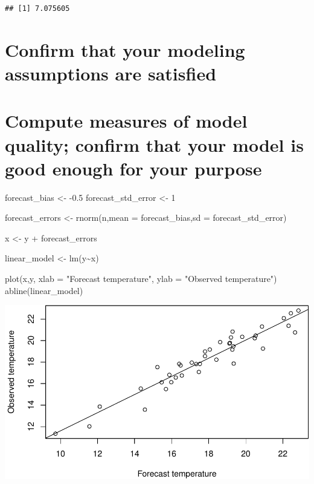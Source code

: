 \documentclass[
]{book}
\newenvironment{Shaded}{\begin{snugshade}}{\end{snugshade}}
\newcommand{\AttributeTok}[1]{\textcolor[rgb]{0.77,0.63,0.00}{#1}}
\newcommand{\DecValTok}[1]{\textcolor[rgb]{0.00,0.00,0.81}{#1}}
\newcommand{\FloatTok}[1]{\textcolor[rgb]{0.00,0.00,0.81}{#1}}
\newcommand{\FunctionTok}[1]{\textcolor[rgb]{0.00,0.00,0.00}{#1}}
\newcommand{\NormalTok}[1]{#1}
\newcommand{\OtherTok}[1]{\textcolor[rgb]{0.56,0.35,0.01}{#1}}
\newcommand{\SpecialCharTok}[1]{\textcolor[rgb]{0.00,0.00,0.00}{#1}}
\newcommand{\StringTok}[1]{\textcolor[rgb]{0.31,0.60,0.02}{#1}}
\begin{document}
\begin{verbatim}
## [1] 7.075605
\end{verbatim}

\hypertarget{confirm-that-your-modeling-assumptions-are-satisfied}{%
\section{Confirm that your modeling assumptions are satisfied}\label{confirm-that-your-modeling-assumptions-are-satisfied}}

\hypertarget{compute-measures-of-model-quality-confirm-that-your-model-is-good-enough-for-your-purpose}{%
\section{Compute measures of model quality; confirm that your model is good enough for your purpose}\label{compute-measures-of-model-quality-confirm-that-your-model-is-good-enough-for-your-purpose}}

\begin{Shaded}
\begin{Highlighting}[]
\NormalTok{forecast\_bias }\OtherTok{\textless{}{-}} \SpecialCharTok{{-}}\FloatTok{0.5}
\NormalTok{forecast\_std\_error }\OtherTok{\textless{}{-}} \DecValTok{1}

\NormalTok{forecast\_errors }\OtherTok{\textless{}{-}} \FunctionTok{rnorm}\NormalTok{(n,}\AttributeTok{mean =}\NormalTok{ forecast\_bias,}\AttributeTok{sd =}\NormalTok{ forecast\_std\_error)}

\NormalTok{x }\OtherTok{\textless{}{-}}\NormalTok{ y }\SpecialCharTok{+}\NormalTok{ forecast\_errors}

\NormalTok{linear\_model }\OtherTok{\textless{}{-}} \FunctionTok{lm}\NormalTok{(y}\SpecialCharTok{\textasciitilde{}}\NormalTok{x)}

\FunctionTok{plot}\NormalTok{(x,y, }\AttributeTok{xlab =} \StringTok{"Forecast temperature"}\NormalTok{, }\AttributeTok{ylab =} \StringTok{"Observed temperature"}\NormalTok{)}
\FunctionTok{abline}\NormalTok{(linear\_model)}
\end{Highlighting}
\end{Shaded}

\includegraphics{graphics/unnamed-chunk-6-1.pdf}
\end{document}
